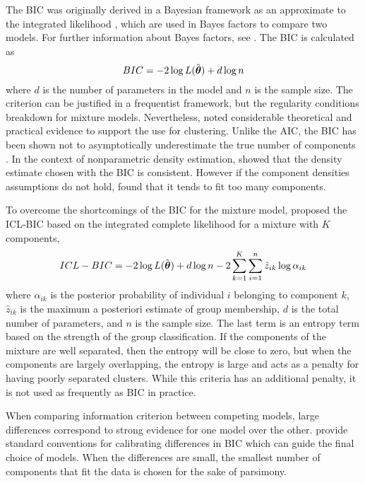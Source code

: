 The BIC was originally derived in a Bayesian framework as an approximate to the integrated likelihood  \cite{schwarz1978}, which are used in Bayes factors to compare two models. For further information about Bayes factors, see \textcite{kass1995}. The BIC is calculated as
$$BIC= -2 \log L(\hat{\boldsymbol\theta}) + d\log n $$
where $d$ is the number of parameters in the model and $n$ is the sample size. The criterion can be justified in a frequentist framework, but the regularity conditions breakdown for mixture models. Nevertheless, \textcite{fraley1998} noted considerable theoretical and practical evidence to support the use for clustering. Unlike the AIC, the BIC has been shown not to asymptotically underestimate the true number of components \cite{leroux1992}. In the context of nonparametric density estimation,  \textcite{roeder1997} showed that the density estimate chosen with the BIC is consistent. However if the component densities assumptions do not hold, \textcite{biernacki2000} found that it tends to fit too many components. 

To overcome the shortcomings of the BIC for the mixture model, \textcite{biernacki2000} proposed the ICL-BIC based on the integrated complete likelihood for a mixture with $K$ components,
$$ICL-BIC = -2\log L(\hat{\boldsymbol\theta}) + d\log n - 2\sum^{K}_{k=1}\sum^{n}_{i=1}\hat{z}_{ik}\log \alpha_{ik}$$
where $\alpha_{ik}$ is the posterior probability of individual $i$ belonging to component $k$, $\hat{z}_{ik}$ is the maximum a posteriori estimate of group membership, $d$ is the total number of parameters, and $n$ is the sample size. The last term is an entropy term based on the strength of the group classification. If the components of the mixture are well separated, then the entropy will be close to zero, but when the components are largely overlapping, the entropy is large and acts as a penalty for having poorly separated clusters. While this criteria has an additional penalty, it is not used as frequently as BIC in practice.

When comparing information criterion between competing models, large differences correspond to strong evidence for one model over the other. \Textcite{kass1995} provide standard conventions for calibrating differences in BIC which can guide the final choice of models. When the differences are small, the smallest number of components that fit the data is chosen for the sake of parsimony.

